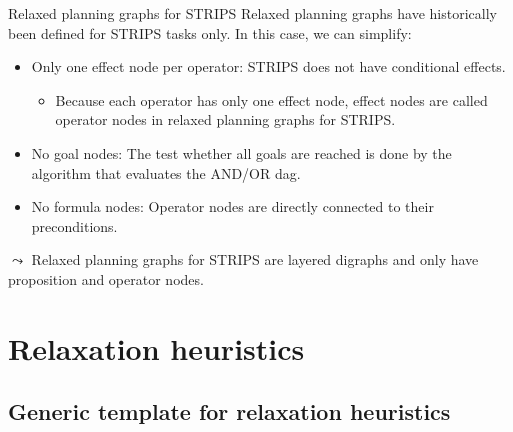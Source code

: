 \documentclass{gkibeamer}
\begin{document}
\begin{frame}
\begin{center}
  \end{center}
\end{frame}

\begin{frame}{Relaxed planning graphs for STRIPS}
   Relaxed planning graphs have historically been
  defined for STRIPS tasks only. In this case, we can simplify:
  \begin{itemize}
  \item \alert{Only one effect node per operator:} STRIPS does not
    have conditional effects.
    \begin{itemize}
    \item Because each operator has only one effect node, effect nodes
      are called \alert{operator nodes} in relaxed planning graphs for
      STRIPS.
    \end{itemize}
  \item \alert{No goal nodes:}
    The test whether all goals are reached is done by the algorithm
    that evaluates the AND/OR dag.
  \item \alert{No formula nodes:} Operator nodes are directly connected
    to their preconditions.
  \end{itemize}
  $\leadsto$ Relaxed planning graphs for STRIPS are \alert{layered}
    digraphs and only have \alert{proposition and operator nodes}.
\end{frame}

\section{Relaxation heuristics}
\subsection[Generic template]{Generic template for relaxation heuristics}
\end{document}
